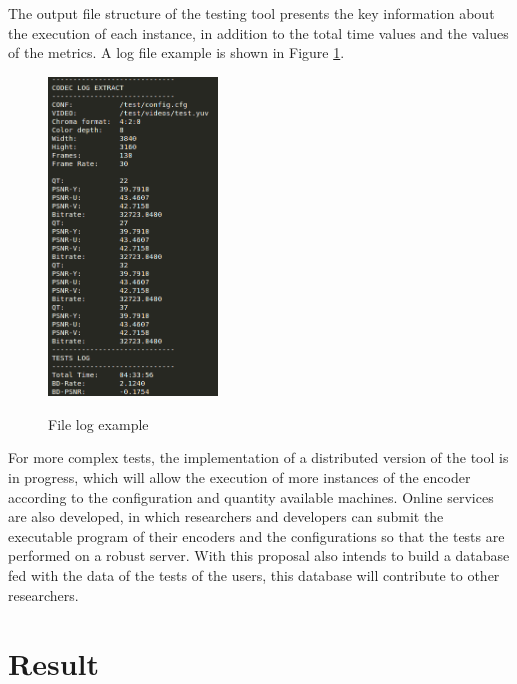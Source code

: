\documentclass{acm_proc_article-sp}
\begin{document}
The output file structure of the testing tool presents the key information about the execution of each instance, in addition to the total time values and the values of the metrics. A log file example is shown in Figure \ref{fig:log}.

\FloatBarrier

\begin{figure}[!ht]
	\centering
	\caption{File log example}
	\includegraphics[width=0.4\textwidth]{figures/log.png}
	\label{fig:log}
\end{figure}

\FloatBarrier

For more complex tests, the implementation of a distributed version of the tool is in progress, which will allow the execution of more instances of the encoder according to the configuration and quantity available machines. Online services are also developed, in which researchers and developers can submit the executable program of their encoders and the configurations so that the tests are performed on a robust server. With this proposal also intends to build a database fed with the data of the tests of the users, this database will contribute to other researchers.
	


\section{Result}

\end{document}
